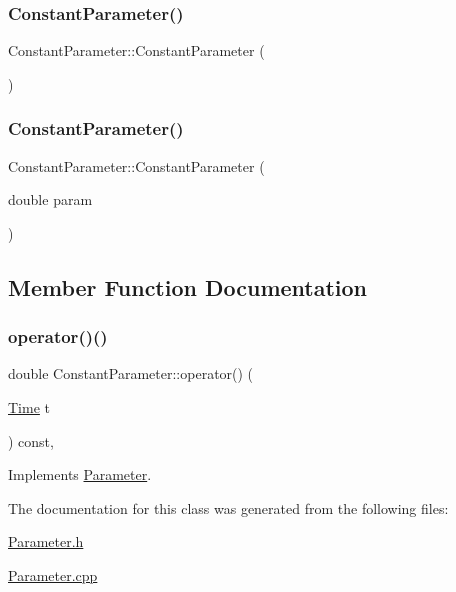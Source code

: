 \subsubsection{\texorpdfstring{Constant\+Parameter()}{ConstantParameter()}\hspace{0.1cm}{\footnotesize\ttfamily [1/2]}}
{\footnotesize\ttfamily Constant\+Parameter\+::\+Constant\+Parameter (\begin{DoxyParamCaption}{ }\end{DoxyParamCaption})\hspace{0.3cm}{\ttfamily [default]}}

\hypertarget{class_constant_parameter_ae3bc9ec65c93b6b88fe04dcb7010d897}{}\label{class_constant_parameter_ae3bc9ec65c93b6b88fe04dcb7010d897} 
\subsubsection{\texorpdfstring{Constant\+Parameter()}{ConstantParameter()}\hspace{0.1cm}{\footnotesize\ttfamily [2/2]}}
{\footnotesize\ttfamily Constant\+Parameter\+::\+Constant\+Parameter (\begin{DoxyParamCaption}\item[{double}]{param }\end{DoxyParamCaption})}



\subsection{Member Function Documentation}
\hypertarget{class_constant_parameter_a23abb141692843e2ef68d43f610beb5e}{}\label{class_constant_parameter_a23abb141692843e2ef68d43f610beb5e} 
\subsubsection{\texorpdfstring{operator()()}{operator()()}}
{\footnotesize\ttfamily double Constant\+Parameter\+::operator() (\begin{DoxyParamCaption}\item[{\hyperlink{_name_def_8h_ac2d3e0ba793497bcca555c7c2cf64ff3}{Time}}]{t }\end{DoxyParamCaption}) const\hspace{0.3cm}{\ttfamily [override]}, {\ttfamily [virtual]}}



Implements \hyperlink{class_parameter_ae6317fac3d0b5e69101eb7059d151ca7}{Parameter}.



The documentation for this class was generated from the following files\+:\begin{DoxyCompactItemize}
\item 
\hyperlink{_parameter_8h}{Parameter.\+h}\item 
\hyperlink{_parameter_8cpp}{Parameter.\+cpp}\end{DoxyCompactItemize}
